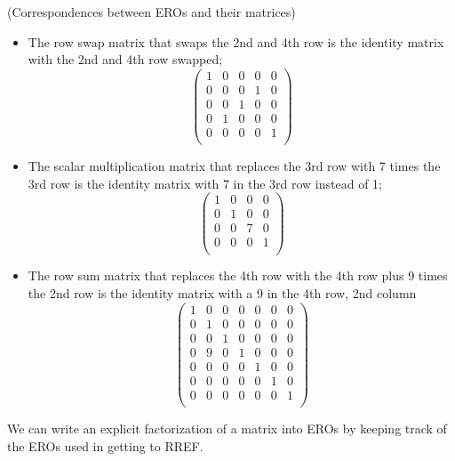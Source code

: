 \begin{example} (Correspondences between EROs and their matrices)
\begin{itemize}
\item The row swap matrix that swaps the 2nd and 4th row is the identity matrix with the 2nd and 4th row swapped; 
\[
\begin{pmatrix}
1&0&0&0&0\\
0&0&0&1&0\\
0&0&1&0&0\\
0&1&0&0&0\\
0&0&0&0&1\\
\end{pmatrix}
\]
\item
The scalar multiplication matrix that replaces the 3rd row with 7 times the 3rd row is the identity matrix with 7 in the 3rd row instead of 1; 
\[
\begin{pmatrix}
1&0&0&0\\
0&1&0&0\\
0&0&7&0\\
0&0&0&1\\
\end{pmatrix}
\]

\item The row sum matrix that replaces the 4th row with the 4th row plus 9 times the 2nd row is the identity matrix with a 9 in the  4th row, 2nd column
\[
\begin{pmatrix}
1&0&0&0&0&0&0\\
0&1&0&0&0&0&0\\
0&0&1&0&0&0&0\\
0&9&0&1&0&0&0\\
0&0&0&0&1&0&0\\
0&0&0&0&0&1&0\\
0&0&0&0&0&0&1\\
\end{pmatrix}
\]
\end{itemize}
\end{example}

We can write an explicit factorization of a matrix into EROs by keeping track of the EROs used in getting to RREF.

